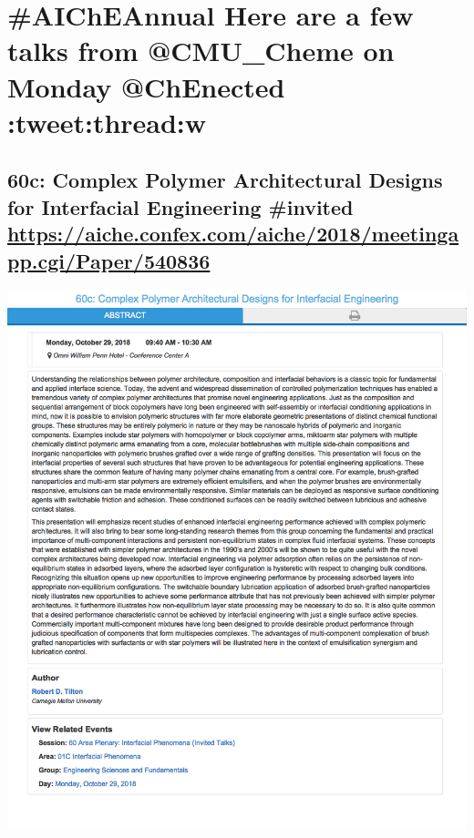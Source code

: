\documentclass[11pt]{article}
\begin{document}
\section{\#AIChEAnnual Here are a few talks from @CMU\_Cheme on Monday @ChEnected :tweet:thread:w}
\label{sec:org3e416e2}

\subsection{60c: Complex Polymer Architectural Designs for Interfacial Engineering \#invited  \url{https://aiche.confex.com/aiche/2018/meetingapp.cgi/Paper/540836}}
\label{sec:orgcd3b29a}
\begin{center}
\includegraphics[width=.9\linewidth]{./540836.png}
\end{center}
\end{document}
